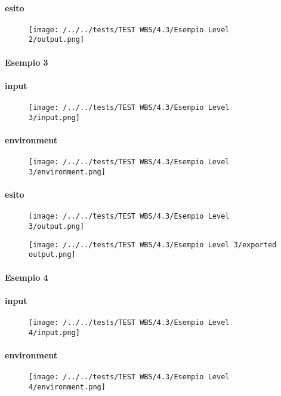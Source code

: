\paragraph{esito}
\begin{figure}
\centering
\texttt{[image: /../../tests/TEST WBS/4.3/Esempio Level 2/output.png]}
\end{figure}

\paragraph{Esempio 3}
\paragraph{input}
\begin{figure}
\centering
\texttt{[image: /../../tests/TEST WBS/4.3/Esempio Level 3/input.png]}
\end{figure}
\paragraph{environment}
\begin{figure}
\centering
\texttt{[image: /../../tests/TEST WBS/4.3/Esempio Level 3/environment.png]}
\end{figure}
\paragraph{esito}
\begin{figure}
\centering
\texttt{[image: /../../tests/TEST WBS/4.3/Esempio Level 3/output.png]}
\end{figure}
\begin{figure}
\centering
\texttt{[image: /../../tests/TEST WBS/4.3/Esempio Level 3/exported output.png]}
\end{figure}


\paragraph{Esempio 4}
\paragraph{input}
\begin{figure}
\centering
\texttt{[image: /../../tests/TEST WBS/4.3/Esempio Level 4/input.png]}
\end{figure}
\paragraph{environment}
\begin{figure}
\centering
\texttt{[image: /../../tests/TEST WBS/4.3/Esempio Level 4/environment.png]}
\end{figure}
